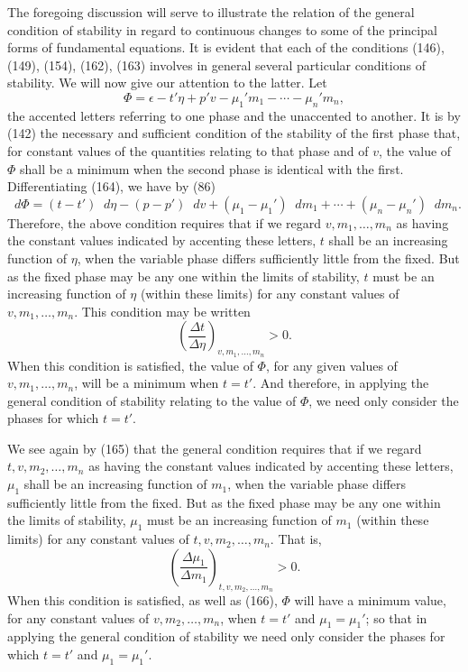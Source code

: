 \documentclass[11pt]{article}
\newcommand{\dd}{\mathop{}\!d}
\newcommand{\eps}{\epsilon}
\newcommand{\D}{\Delta}
\begin{document}
The foregoing discussion will serve to illustrate the relation of the general condition of stability in regard to continuous changes to some of the principal forms of fundamental equations. It is evident that each of the conditions (146), (149), (154), (162), (163) involves in general several particular conditions of stability. We will now give our attention to the latter. Let
\begin{equation}
\Phi=\eps-t'\eta+p'v-\mu_1'm_1-\cdots-\mu_n'm_n,
\end{equation}
the accented letters referring to one phase and the unaccented to another. It is by (142) the necessary and sufficient condition of the stability of the first phase that, for constant values of the quantities relating to that phase and of $v$, the value of $\Phi$ shall be a minimum when the second phase is identical with the first. Differentiating (164), we have by (86)
\begin{equation}
\dd\Phi=(t-t')\dd\eta-(p-p')\dd v+(\mu_1-\mu_1')\dd m_1+\cdots+(\mu_n-\mu_n')\dd m_n.
\end{equation}
Therefore, the above condition requires that if we regard $v,m_1,\ldots,m_n$ as having the constant values indicated by accenting these letters, $t$ shall be an increasing function of $\eta$, when the variable phase differs sufficiently little from the fixed. But as the fixed phase may be any one within the limits of stability, $t$ must be an increasing function of $\eta$ (within these limits) for any constant values of $v,m_1,\ldots,m_n$. This condition may be written
\begin{equation}
\left(\frac{\D t}{\D\eta}\right)_{v,m_1,\ldots,m_n}>0.
\end{equation}
When this condition is satisfied, the value of $\Phi$, for any given values of $v,m_1,\ldots,m_n$, will be a minimum when $t=t'$. And therefore, in applying the general condition of stability relating to the value of $\Phi$, we need only consider the phases for which $t=t'$.

We see again by (165) that the general condition requires that if we regard $t,v,m_2,\ldots,m_n$ as having the constant values indicated by accenting these letters, $\mu_1$ shall be an increasing function of $m_1$, when the variable phase differs sufficiently little from the fixed. But as the fixed phase may be any one within the limits of stability, $\mu_1$ must be an increasing function of $m_1$ (within these limits) for any constant values of $t,v,m_2,\ldots,m_n$. That is,
\begin{equation}
\left(\frac{\D\mu_1}{\D m_1}\right)_{t,v,m_2,\ldots,m_n}>0.
\end{equation}
When this condition is satisfied, as well as (166), $\Phi$ will have a minimum value, for any constant values of $v,m_2,\ldots,m_n$, when $t=t'$ and $\mu_1=\mu_1'$; so that in applying the general condition of stability we need only consider the phases for which $t=t'$ and $\mu_1=\mu_1'$.
\end{document}
